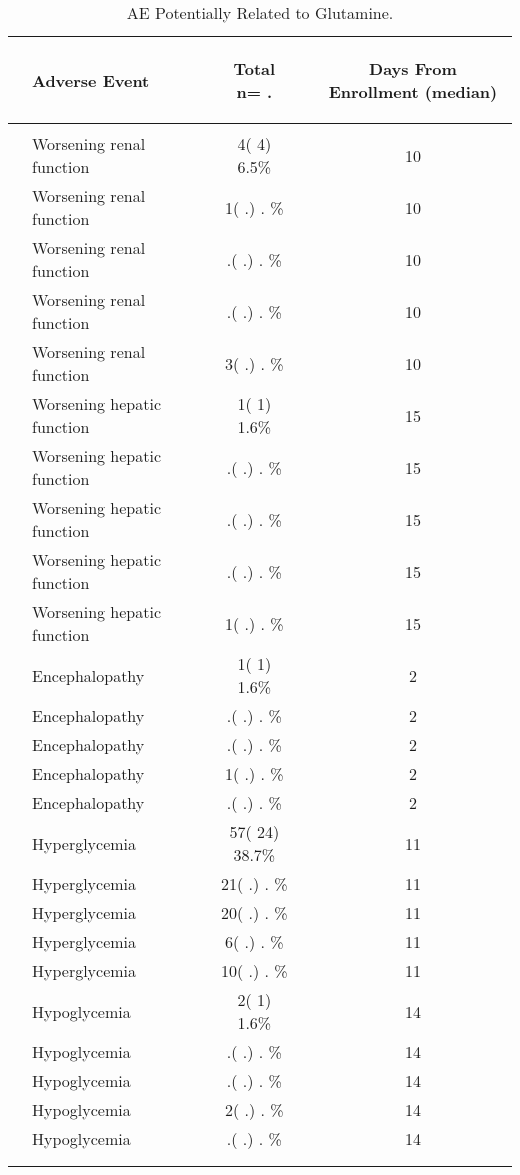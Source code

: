 \documentclass[dvips,10pt]{article}
\begin{document}
\begin{table}[t]
\caption
{ AE Potentially Related to Glutamine. }
\begin{center}
\begin{tabular}{ @{}l@{}
@{}l@{}@{}p{1.5em}@{}@{}c@{}@{}p{1.5em}@{}@{}c@{}
}
\hline

& \parbox{6em}{\begin{center}Adverse Event\end{center}} && \parbox{6em}{\begin{center}Total n= .\end{center}} && \parbox{6em}{\begin{center}Days From Enrollment  (median)\end{center}} \\

\hline

\\
& Worsening renal function && 4(  4)  6.5\% && 10 \\
& Worsening renal function && 1(  .)   . \% && 10 \\
& Worsening renal function && .(  .)   . \% && 10 \\
& Worsening renal function && .(  .)   . \% && 10 \\
& Worsening renal function && 3(  .)   . \% && 10 \\
& Worsening hepatic function && 1(  1)  1.6\% && 15 \\
& Worsening hepatic function && .(  .)   . \% && 15 \\
& Worsening hepatic function && .(  .)   . \% && 15 \\
& Worsening hepatic function && .(  .)   . \% && 15 \\
& Worsening hepatic function && 1(  .)   . \% && 15 \\
& Encephalopathy && 1(  1)  1.6\% && 2 \\
& Encephalopathy && .(  .)   . \% && 2 \\
& Encephalopathy && .(  .)   . \% && 2 \\
& Encephalopathy && 1(  .)   . \% && 2 \\
& Encephalopathy && .(  .)   . \% && 2 \\
& Hyperglycemia && 57( 24) 38.7\% && 11 \\
& Hyperglycemia && 21(  .)   . \% && 11 \\
& Hyperglycemia && 20(  .)   . \% && 11 \\
& Hyperglycemia && 6(  .)   . \% && 11 \\
& Hyperglycemia && 10(  .)   . \% && 11 \\
& Hypoglycemia && 2(  1)  1.6\% && 14 \\
& Hypoglycemia && .(  .)   . \% && 14 \\
& Hypoglycemia && .(  .)   . \% && 14 \\
& Hypoglycemia && 2(  .)   . \% && 14 \\
& Hypoglycemia && .(  .)   . \% && 14 \\
\\
\hline \\


\end{tabular}
\end{center}
\end{table}
\end{document}
